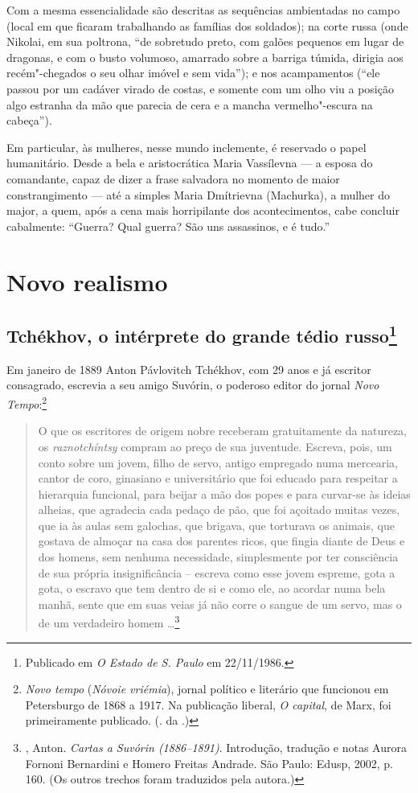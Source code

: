 Com a mesma essencialidade são descritas as sequências ambientadas no
campo (local em que ficaram trabalhando as famílias dos soldados); na
corte russa (onde Nikolai, em sua poltrona, ``de sobretudo preto, com
galões pequenos em lugar de dragonas, e com o busto volumoso, amarrado
sobre a barriga túmida, dirigia aos recém"-chegados o seu olhar imóvel e
sem vida''); e nos acampamentos (``ele passou por um cadáver virado de
costas, e somente com um olho viu a posição algo estranha da mão que
parecia de cera e a mancha vermelho"-escura na cabeça'').

Em particular, às mulheres, nesse mundo inclemente, é reservado o papel
humanitário. Desde a bela e aristocrática Maria Vassílevna --- a esposa
do comandante, capaz de dizer a frase salvadora no momento de maior
constrangimento --- até a simples Maria Dmítrievna (Machurka), a mulher
do major, a quem, após a cena mais horripilante dos acontecimentos, cabe
concluir cabalmente: ``Guerra? Qual guerra? São uns assassinos, e é
tudo.''

\part{Novo realismo}

\chapter{Tchékhov, o intérprete do grande tédio russo\footnote{Publicado em \emph{O Estado de S. Paulo} em 22/11/1986.}}

Em janeiro de 1889 Anton Pávlovitch Tchékhov, com 29 anos e já
escritor consagrado, escrevia a seu amigo Suvórin, o poderoso
editor do jornal \emph{Novo Tempo}:\footnote{\emph{Novo tempo}
(\emph{Nóvoie vriémia}), jornal político e literário que
funcionou em Petersburgo de 1868 a 1917. Na publicação liberal,
\emph{O capital}, de Marx, foi primeiramente publicado.
(. da .)}

\begin{quotation}
O que os escritores de origem nobre receberam gratuitamente da
natureza, os \emph{raznotchíntsy} compram ao preço de sua
juventude. Escreva, pois, um conto sobre um jovem, filho de
servo, antigo empregado numa mercearia, cantor de coro, ginasiano
e universitário que foi educado para respeitar a hierarquia
funcional, para beijar a mão dos popes e para curvar-se às
ideias alheias, que agradecia cada pedaço de pão, que foi açoitado
muitas vezes, que ia às aulas sem galochas, que brigava, que
torturava os animais, que gostava de almoçar na casa dos parentes
ricos, que fingia diante de Deus e dos homens, sem nenhuma
necessidade, simplesmente por ter consciência de sua própria
insignificância -- escreva como esse jovem espreme, gota a gota,
o escravo que tem dentro de si e como ele, ao acordar numa bela
manhã, sente que em suas veias já não corre o sangue de um servo,
mas o de um verdadeiro homem \ldots{}\footnote{,
Anton. \emph{Cartas a Suvórin (1886--1891)}. Introdução, tradução
e notas Aurora Fornoni Bernardini e Homero Freitas Andrade.
São Paulo: Edusp, 2002, p. 160. (Os outros trechos foram
traduzidos pela autora.)}
\end{quotation}

